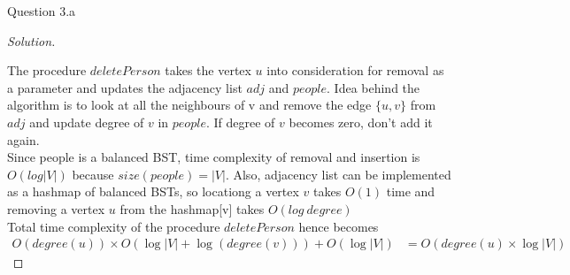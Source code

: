 \begin{solution}{Question 3.a}
\begin{proof}[Solution]
\begin{algorithm}[H]
\begin{algorithmic}[1]
                     
                        \EndIf{}
                        \EndIf{}
                        \EndIf{}
                        \EndIf{}
                    \EndWhile{}
                     
                    \EndFor{}
                \EndProcedure{}
            \end{algorithmic}
        \end{algorithm}
        
        The procedure $deletePerson$ takes the vertex $u$ into consideration for removal as a parameter and updates the adjacency list $adj$ and $people$. Idea behind the algorithm is to look at all the neighbours of v and remove the edge $\{u,v\}$ from $adj$ and update degree of $v$ in $people$. If degree of $v$ becomes zero, don't add it again.\\
        Since people is a balanced BST, time complexity of removal and insertion is $O(log|V|)$ because $size(people)=|V|$. Also, adjacency list can be implemented as a hashmap of balanced BSTs, so locationg a vertex $v$ takes $O(1)$ time and removing a vertex $u$ from the hashmap[v] takes $O(log \ degree)$
        \\
        Total time complexity of the procedure $deletePerson$ hence becomes
        \begin{equation}
            \begin{split}
                O(degree(u))\times O(\log|V| +\log(degree(v)))+O(\log|V| )
                &=O(degree(u)\times \log|V|)
            \end{split}
        \end{equation}


\end{proof}
\end{solution}
